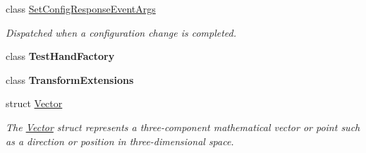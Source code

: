 \begin{DoxyCompactItemize}
class \mbox{\hyperlink{class_leap_1_1_set_config_response_event_args}{Set\+Config\+Response\+Event\+Args}}
\begin{DoxyCompactList}\small\item\em Dispatched when a configuration change is completed. \end{DoxyCompactList}\item 
class {\bfseries Test\+Hand\+Factory}
\item 
class {\bfseries Transform\+Extensions}
\item 
struct \mbox{\hyperlink{struct_leap_1_1_vector}{Vector}}
\begin{DoxyCompactList}\small\item\em The \mbox{\hyperlink{struct_leap_1_1_vector}{Vector}} struct represents a three-\/component mathematical vector or point such as a direction or position in three-\/dimensional space. \end{DoxyCompactList}\end{DoxyCompactItemize}
